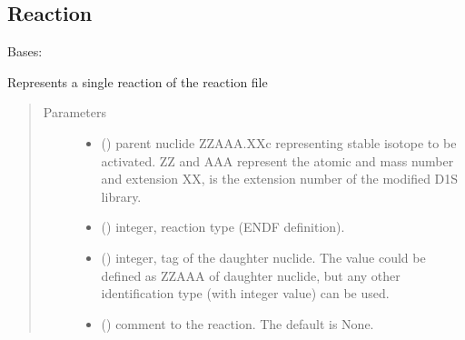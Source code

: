 \documentclass[letterpaper,10pt,english]{sphinxmanual}
\begin{document}
\subsection{Reaction}
\label{\detokenize{api/inputgeneration:reaction}}

\begin{fulllineitems}
\label{\detokenize{api/inputgeneration:parsersD1S.Reaction}}
\sphinxAtStartPar
Bases: 

\sphinxAtStartPar
Represents a single reaction of the reaction file
\begin{quote}\begin{description}
\item[{Parameters}] \leavevmode\begin{itemize}
\item {} 
\sphinxAtStartPar
{} () \textendash{} parent nuclide ZZAAA.XXc representing stable isotope to be
activated. ZZ and AAA represent the atomic and mass number and
extension XX, is the extension number of the modified D1S library.

\item {} 
\sphinxAtStartPar
{} () \textendash{} integer, reaction type (ENDF definition).

\item {} 
\sphinxAtStartPar
{} () \textendash{} integer, tag of the daughter nuclide. The value could be
defined as ZZAAA of daughter nuclide, but any other identification
type (with integer value) can be used.

\item {} 
\sphinxAtStartPar
{} (\sphinxstyleliteralemphasis{\sphinxupquote{, }}) \textendash{} comment to the reaction. The default is None.


\end{itemize}
\end{description}
\end{quote}
\end{fulllineitems}
\end{document}
